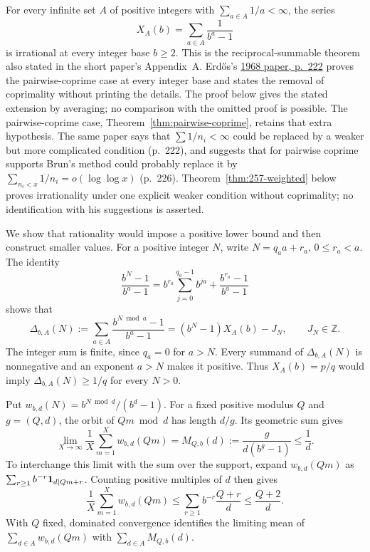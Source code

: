 \documentclass[11pt]{article}
\theoremstyle{plain}
\theoremstyle{definition}
\theoremstyle{remark}
\begin{document}
For every infinite set $A$ of positive integers with
$\sum_{a\in A}1/a<\infty$, the series
\[
 X_A(b)=\sum_{a\in A}\frac1{b^a-1}
\]
is irrational at every integer base $b\ge2$. This is the
reciprocal-summable theorem also stated in the short paper's
Appendix~A. Erd\H{o}s's
\href{https://users.renyi.hu/~p_erdos/1969-09.pdf}{1968 paper, p.~222}
proves the pairwise-coprime case at every integer base and states the removal
of coprimality without printing the details. The proof below gives the stated extension by averaging; no comparison
with the omitted proof is possible.  The pairwise-coprime case,
Theorem~\ref{thm:pairwise-coprime}, retains that extra hypothesis. The same
paper says that $\sum1/n_i<\infty$ could be replaced by a weaker but more
complicated condition (p.~222), and suggests that for pairwise coprime
supports Brun's method could probably replace it by
$\sum_{n_i<x}1/n_i=o(\log\log x)$ (p.~226).
Theorem~\ref{thm:257-weighted} below proves irrationality under one explicit
weaker condition without coprimality; no identification with his suggestions
is asserted.

We show that rationality would impose a positive lower bound and then
construct smaller values. For a positive integer $N$, write
$N=q_a a+r_a$, $0\le r_a<a$. The identity
\[
 \frac{b^N-1}{b^a-1}
 =b^{r_a}\sum_{j=0}^{q_a-1}b^{ja}
  +\frac{b^{r_a}-1}{b^a-1}
\]
shows that
\[
 \Delta_{b,A}(N):=\sum_{a\in A}\frac{b^{N\bmod a}-1}{b^a-1}
 =(b^N-1)X_A(b)-J_N,\qquad J_N\in\mathbb Z.
\]
The integer sum is finite, since $q_a=0$ for $a>N$. Every summand of
$\Delta_{b,A}(N)$ is nonnegative and an exponent $a>N$ makes it positive.
Thus $X_A(b)=p/q$ would imply $\Delta_{b,A}(N)\ge1/q$ for every $N>0$.

Put $w_{b,d}(N)=b^{N\bmod d}/(b^d-1)$. For a fixed positive modulus $Q$
and $g=(Q,d)$, the orbit of $Qm\bmod d$ has length $d/g$. Its geometric sum
gives
\[
 \lim_{X\to\infty}\frac1X\sum_{m=1}^Xw_{b,d}(Qm)
 =M_{Q,b}(d):=\frac{g}{d(b^g-1)}\le\frac1d.
\]
To interchange this limit with the sum over the support, expand
$w_{b,d}(Qm)$ as $\sum_{r\ge1}b^{-r}{\bf1}_{d\mid Qm+r}$.
Counting positive multiples of $d$ then gives
\[
 \frac1X\sum_{m=1}^Xw_{b,d}(Qm)
 \le\sum_{r\ge1}b^{-r}\frac{Q+r}{d}
 \le\frac{Q+2}{d}.
\]
With $Q$ fixed, dominated convergence identifies the limiting mean of $\sum_{d\in A}w_{b,d}(Qm)$ with $\sum_{d\in A}M_{Q,b}(d)$.
\end{document}
